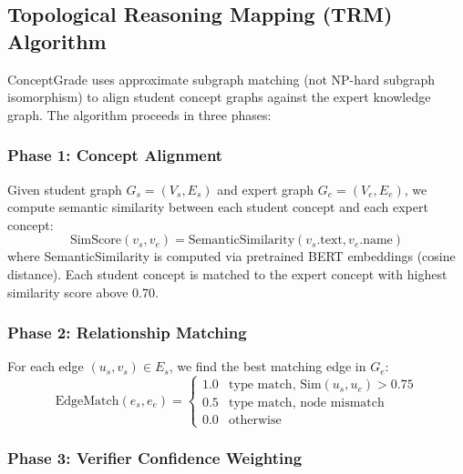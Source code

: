 \documentclass[conference]{IEEEtran}
\begin{document}
\subsection{Topological Reasoning Mapping (TRM) Algorithm}
\label{subsec:trm_algorithm}

ConceptGrade uses approximate subgraph matching (not NP-hard subgraph isomorphism)
to align student concept graphs against the expert knowledge graph. The algorithm
proceeds in three phases:

\subsubsection{Phase 1: Concept Alignment}

Given student graph $G_s = (V_s, E_s)$ and expert graph $G_e = (V_e, E_e)$,
we compute semantic similarity between each student concept and each expert concept:
\begin{equation}
  \text{SimScore}(v_s, v_e) = \text{SemanticSimilarity}(v_s.\text{text}, v_e.\text{name})
  \label{eq:concept_sim}
\end{equation}
where SemanticSimilarity is computed via pretrained BERT embeddings (cosine distance).
Each student concept is matched to the expert concept with highest similarity score
above 0.70.

\subsubsection{Phase 2: Relationship Matching}

For each edge $(u_s, v_s) \in E_s$, we find the best matching edge in $G_e$:
\begin{equation}
  \text{EdgeMatch}(e_s, e_e) =
  \begin{cases}
    1.0 & \text{type match, } \mathrm{Sim}(u_s,u_e)\!>\!0.75 \\
    0.5 & \text{type match, node mismatch} \\
    0.0 & \text{otherwise}
  \end{cases}
  \label{eq:edge_match}
\end{equation}

\subsubsection{Phase 3: Verifier Confidence Weighting}
\end{document}
